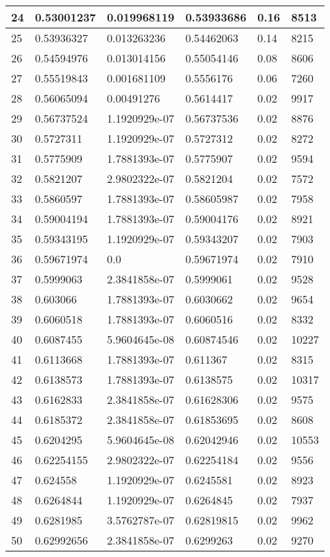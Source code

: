 \begin{longtable}{|l|l|l|l|l|l|}
24 & 0.53001237 & 0.019968119 & 0.53933686 & 0.16 & 8513 \\ \hline 
25 & 0.53936327 & 0.013263236 & 0.54462063 & 0.14 & 8215 \\ \hline 
26 & 0.54594976 & 0.013014156 & 0.55054146 & 0.08 & 8606 \\ \hline 
27 & 0.55519843 & 0.001681109 & 0.5556176 & 0.06 & 7260 \\ \hline 
28 & 0.56065094 & 0.00491276 & 0.5614417 & 0.02 & 9917 \\ \hline 
29 & 0.56737524 & 1.1920929e-07 & 0.56737536 & 0.02 & 8876 \\ \hline 
30 & 0.5727311 & 1.1920929e-07 & 0.5727312 & 0.02 & 8272 \\ \hline 
31 & 0.5775909 & 1.7881393e-07 & 0.5775907 & 0.02 & 9594 \\ \hline 
32 & 0.5821207 & 2.9802322e-07 & 0.5821204 & 0.02 & 7572 \\ \hline 
33 & 0.5860597 & 1.7881393e-07 & 0.58605987 & 0.02 & 7958 \\ \hline 
34 & 0.59004194 & 1.7881393e-07 & 0.59004176 & 0.02 & 8921 \\ \hline 
35 & 0.59343195 & 1.1920929e-07 & 0.59343207 & 0.02 & 7903 \\ \hline 
36 & 0.59671974 & 0.0 & 0.59671974 & 0.02 & 7910 \\ \hline 
37 & 0.5999063 & 2.3841858e-07 & 0.5999061 & 0.02 & 9528 \\ \hline 
38 & 0.603066 & 1.7881393e-07 & 0.6030662 & 0.02 & 9654 \\ \hline 
39 & 0.6060518 & 1.7881393e-07 & 0.6060516 & 0.02 & 8332 \\ \hline 
40 & 0.6087455 & 5.9604645e-08 & 0.60874546 & 0.02 & 10227 \\ \hline 
41 & 0.6113668 & 1.7881393e-07 & 0.611367 & 0.02 & 8315 \\ \hline 
42 & 0.6138573 & 1.7881393e-07 & 0.6138575 & 0.02 & 10317 \\ \hline 
43 & 0.6162833 & 2.3841858e-07 & 0.61628306 & 0.02 & 9575 \\ \hline 
44 & 0.6185372 & 2.3841858e-07 & 0.61853695 & 0.02 & 8608 \\ \hline 
45 & 0.6204295 & 5.9604645e-08 & 0.62042946 & 0.02 & 10553 \\ \hline 
46 & 0.62254155 & 2.9802322e-07 & 0.62254184 & 0.02 & 9556 \\ \hline 
47 & 0.624558 & 1.1920929e-07 & 0.6245581 & 0.02 & 8923 \\ \hline 
48 & 0.6264844 & 1.1920929e-07 & 0.6264845 & 0.02 & 7937 \\ \hline 
49 & 0.6281985 & 3.5762787e-07 & 0.62819815 & 0.02 & 9962 \\ \hline 
50 & 0.62992656 & 2.3841858e-07 & 0.6299263 & 0.02 & 9270 \\ \hline 
\end{longtable}